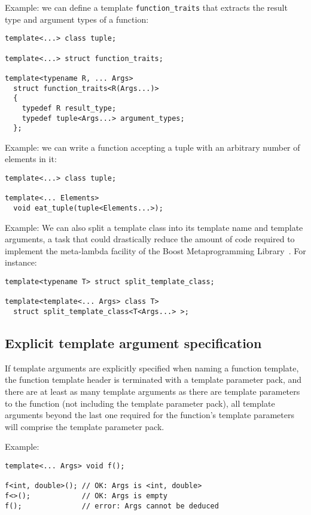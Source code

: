 \documentclass{article}
\begin{document}
Example: we can define a template {\tt function\_traits} that extracts
the result type and argument types of a function:
\begin{verbatim}
template<...> class tuple;

template<...> struct function_traits;

template<typename R, ... Args> 
  struct function_traits<R(Args...)>
  { 
    typedef R result_type; 
    typedef tuple<Args...> argument_types;
  };
\end{verbatim}

Example: we can write a function accepting a tuple with an arbitrary
number of elements in it:
\begin{verbatim}
template<...> class tuple;

template<... Elements>
  void eat_tuple(tuple<Elements...>);
\end{verbatim}

Example: We can also split a template class into its template name and
template arguments, a task that could drastically reduce the amount of
code required to implement the meta-lambda facility of the Boost
Metaprogramming Library~\cite{Gurtovoy02}. For instance:

\begin{verbatim}
template<typename T> struct split_template_class;

template<template<... Args> class T> 
  struct split_template_class<T<Args...> >;
\end{verbatim}

\subsection{Explicit template argument specification}
If template arguments are explicitly specified when naming a function
template, the function template header is terminated with a template
parameter pack, and there are at least as many template arguments as
there are template parameters to the function (not including the
template parameter pack), all template arguments beyond the last one
required for the function's template parameters will comprise the
template parameter pack.

Example:
\begin{verbatim}
template<... Args> void f();

f<int, double>(); // OK: Args is <int, double>
f<>();            // OK: Args is empty
f();              // error: Args cannot be deduced
\end{verbatim}
\end{document}
